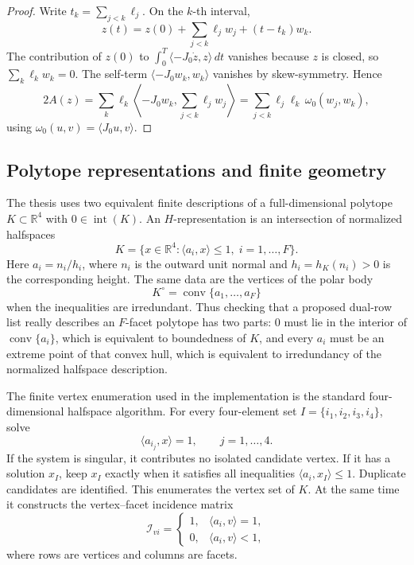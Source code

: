 \begin{proof}
Write \(t_k=\sum_{j<k}\ell_j\). On the \(k\)-th interval,
\[
  z(t)=z(0)+\sum_{j<k}\ell_jw_j+(t-t_k)w_k.
\]
The contribution of \(z(0)\) to
\(\int_0^T\langle -J_0\dot z,z\rangle\,dt\) vanishes because \(z\) is closed,
so \(\sum_k\ell_kw_k=0\). The self-term
\(\langle -J_0w_k,w_k\rangle\) vanishes by skew-symmetry. Hence
\[
  2A(z)
  =
  \sum_k
    \ell_k\left\langle -J_0w_k,\sum_{j<k}\ell_jw_j\right\rangle
  =
  \sum_{j<k}\ell_j\ell_k\,\omega_0(w_j,w_k),
\]
using \(\omega_0(u,v)=\langle J_0u,v\rangle\).
\end{proof}

\subsection{Polytope representations and finite geometry}
\label{subsec:preliminaries-polytope-finite-geometry}

The thesis uses two equivalent finite descriptions of a full-dimensional
polytope \(K\subset\mathbb{R}^4\) with \(0\in\operatorname{int}(K)\). An
\(H\)-representation is an intersection of normalized halfspaces
\[
  K=\{x\in\mathbb{R}^4:\langle a_i,x\rangle\leq 1,\; i=1,\ldots,F\}.
\]
Here \(a_i=n_i/h_i\), where \(n_i\) is the outward unit normal and
\(h_i=h_K(n_i)>0\) is the corresponding height. The same data are the vertices
of the polar body
\[
  K^\circ=\operatorname{conv}\{a_1,\ldots,a_F\}
\]
when the inequalities are irredundant. Thus checking that a proposed dual-row
list really describes an \(F\)-facet polytope has two parts: \(0\) must lie in
the interior of \(\operatorname{conv}\{a_i\}\), which is equivalent to
boundedness of \(K\), and every \(a_i\) must be an extreme point of that convex
hull, which is equivalent to irredundancy of the normalized halfspace
description.

The finite vertex enumeration used in the implementation is the standard
four-dimensional halfspace algorithm. For every four-element set
\(I=\{i_1,i_2,i_3,i_4\}\), solve
\[
  \langle a_{i_j},x\rangle=1,
  \qquad j=1,\ldots,4.
\]
If the system is singular, it contributes no isolated candidate vertex. If it
has a solution \(x_I\), keep \(x_I\) exactly when it satisfies all inequalities
\(\langle a_i,x_I\rangle\leq1\). Duplicate candidates are identified. This
enumerates the vertex set of \(K\). At the same time it constructs the
vertex--facet incidence matrix
\[
  \mathcal I_{v i}
  =
  \begin{cases}
    1,&\langle a_i,v\rangle=1,\\
    0,&\langle a_i,v\rangle<1,
  \end{cases}
\]
where rows are vertices and columns are facets.


